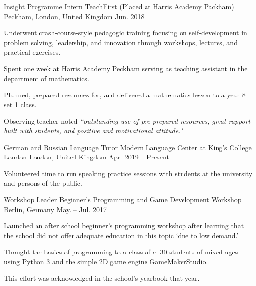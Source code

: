 

\begin{cventries}

  \cventry
  {Insight Programme Intern} %
  {TeachFirst (Placed at Harris Academy Packham)} %
    {Peckham, London, United Kingdom} %
    {Jun. 2018} %
    {
      \begin{cvitems} %
        \item {Underwent crash-course-style pedagogic training focusing on self-development in problem solving, leadership, and innovation through workshops, lectures, and practical exercises.}
        \item {Spent one week at Harris Academy Peckham serving as teaching assistant in the department of mathematics.}
        \item {Planned, prepared resources for, and delivered a mathematics lesson to a year 8 set 1 class.}
        \item {Observing teacher noted \textit{``outstanding use of pre-prepared resources, great rapport built with students, and positive and motivational attitude."}}
      \end{cvitems}
    }

\cventry
{German and Russian Language Tutor} %
{Modern Language Center at King’s College London} %
  {London, United Kingdom} %
  {Apr. 2019 -- Present} %
  {
    \begin{cvitems} %
      \item {Volunteered time to run speaking practice sessions with students at the university and persons of the public.}
    \end{cvitems}
  }

\cventry
{Workshop Leader} %
{Beginner's Programming and Game Development Workshop} %
  {Berlin, Germany} %
  {May. -- Jul. 2017} %
  {
    \begin{cvitems} %
      \item {Launched an after school beginner’s programming workshop after learning that the school did not offer adequate education in this topic `due to low demand.'}
      \item {Thought the basics of programming to a class of c. 30 students of mixed ages using Python 3 and the simple 2D game engine GameMakerStudio.}
      \item {This effort was acknowledged in the school’s yearbook that year.}
    \end{cvitems}
  }

\end{cventries}
